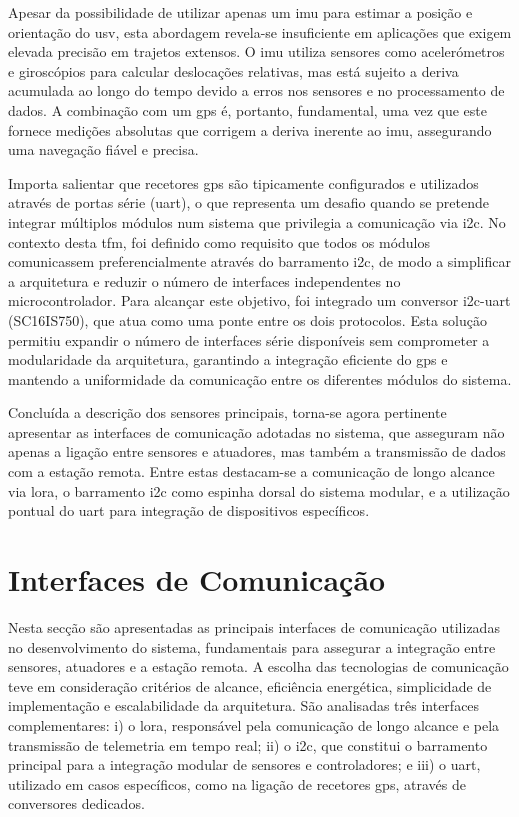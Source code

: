 Apesar da possibilidade de utilizar apenas um \gls{imu} para estimar a posição e orientação do \gls{usv}, esta abordagem revela-se insuficiente em aplicações que exigem elevada precisão em trajetos extensos. O \gls{imu} utiliza sensores como acelerómetros e giroscópios para calcular deslocações relativas, mas está sujeito a deriva acumulada ao longo do tempo devido a erros nos sensores e no processamento de dados. A combinação com um \gls{gps} é, portanto, fundamental, uma vez que este fornece medições absolutas que corrigem a deriva inerente ao \gls{imu}, assegurando uma navegação fiável e precisa.  

Importa salientar que recetores \gls{gps} são tipicamente configurados e utilizados através de portas série (\gls{uart}), o que representa um desafio quando se pretende integrar múltiplos módulos num sistema que privilegia a comunicação via \gls{i2c}. No contexto desta \gls{tfm}, foi definido como requisito que todos os módulos comunicassem preferencialmente através do barramento \gls{i2c}, de modo a simplificar a arquitetura e reduzir o número de interfaces independentes no microcontrolador. Para alcançar este objetivo, foi integrado um conversor \gls{i2c}-\gls{uart} (SC16IS750), que atua como uma ponte entre os dois protocolos. Esta solução permitiu expandir o número de interfaces série disponíveis sem comprometer a modularidade da arquitetura, garantindo a integração eficiente do \gls{gps} e mantendo a uniformidade da comunicação entre os diferentes módulos do sistema.  

Concluída a descrição dos sensores principais, torna-se agora pertinente apresentar as interfaces de comunicação adotadas no sistema, que asseguram não apenas a ligação entre sensores e atuadores, mas também a transmissão de dados com a estação remota. Entre estas destacam-se a comunicação de longo alcance via \gls{lora}, o barramento \gls{i2c} como espinha dorsal do sistema modular, e a utilização pontual do \gls{uart} para integração de dispositivos específicos.

\section{Interfaces de Comunicação}

Nesta secção são apresentadas as principais interfaces de comunicação utilizadas no desenvolvimento do sistema, fundamentais para assegurar a integração entre sensores, atuadores e a estação remota. A escolha das tecnologias de comunicação teve em consideração critérios de alcance, eficiência energética, simplicidade de implementação e escalabilidade da arquitetura. São analisadas três interfaces complementares: i) o \gls{lora}, responsável pela comunicação de longo alcance e pela transmissão de telemetria em tempo real; ii) o \gls{i2c}, que constitui o barramento principal para a integração modular de sensores e controladores; e iii) o \gls{uart}, utilizado em casos específicos, como na ligação de recetores \gls{gps}, através de conversores dedicados.  

